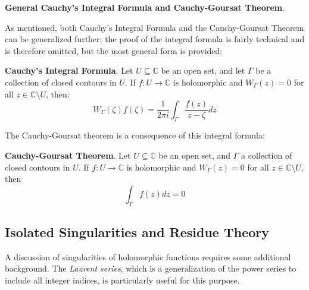 \begin{framed}
\textbf{General Cauchy's Integral Formula and Cauchy-Goursat Theorem}. 

As mentioned, both Cauchy's Integral Formula and the Cauchy-Goursat Theorem can be generalized further; the proof of the integral formula is fairly technical and is therefore omitted, but the most general form is provided:

\textbf{Cauchy's Integral Formula}. Let $U\subseteq\mathbb{C}$ be an open set, and let $\Gamma$ be a collection of closed contours in $U$. If $f:U\to\mathbb{C}$ is holomorphic and $W_\Gamma(z)=0$ for all $z\in \mathbb{C}\setminus U$, then: \[W_\Gamma (\zeta)f(\zeta) = \frac{1}{2\pi i} \int_\Gamma \frac{f(z)}{z-\zeta} dz\]

The Cauchy-Goursat theorem is a consequence of this integral formula:

\textbf{Cauchy-Goursat Theorem}. Let $U\subseteq\mathbb{C}$ be an open set, and $\Gamma$ a collection of closed contours in $U$. If $f:U\to\mathbb{C}$ is holomorphic and $W_\Gamma(z)=0$ for all $z\in\mathbb{C}\setminus U$, then \[\int_\Gamma f(z)dz = 0\]
\end{framed}

\newpage\subsection{Isolated Singularities and Residue Theory}

A discussion of singularities of holomorphic functions requires some additional background. The \textit{Laurent series}, which is a generalization of the power series to include all integer indices, is particularly useful for this purpose.

